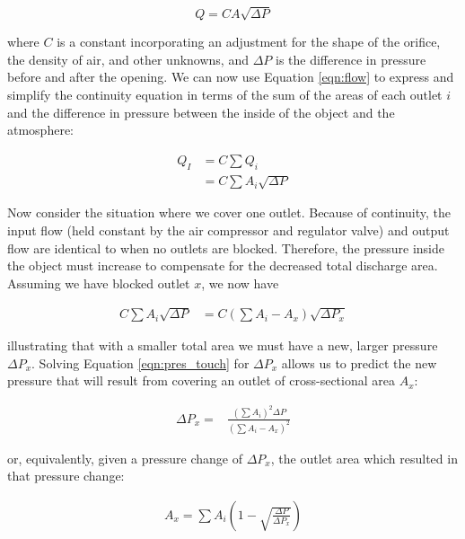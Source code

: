 				\begin{equation}
					Q = CA\sqrt{\Delta P}
					\label{eqn:flow}
				\end{equation}

				where $C$ is a constant incorporating an adjustment for the shape of the
				orifice, the density of air, and other unknowns, and $\Delta P$ is the
				difference in pressure before and after the opening. We can now use
				Equation \ref{eqn:flow} to express and simplify the continuity equation in terms
				of the sum of the areas of each outlet $i$ and the difference in pressure
				between the inside of the object and the atmosphere:

				\begin{align}
					Q_I &= C\sum Q_i \nonumber \\
							&= C\sum A_i \sqrt{\Delta P}
							\label{eqn:flow-per-outlet}
				\end{align}

				Now consider the situation where we cover one outlet. Because of
				continuity, the input flow (held constant by the air compressor and
				regulator valve) and output flow are identical to when no outlets are
				blocked. Therefore, the pressure inside the object must increase to
				compensate for the decreased total discharge area. Assuming we have
				blocked outlet $x$, we now have

				\begin{align}
					C\sum A_i \sqrt{\Delta P} &= C\left( \sum A_i - A_x \right) \sqrt{\Delta P_x}
					\label{eqn:pres_touch}
				\end{align}

				illustrating that with a smaller total area we must have a new, larger
				pressure $\Delta P_x$. Solving Equation \ref{eqn:pres_touch} for $\Delta P_x$
				allows us to predict the new pressure that will result from covering an
				outlet of cross-sectional area $A_x$:

				\begin{align}
					\Delta P_x =& \frac{(\sum A_i)^2 \Delta P}{(\sum A_i - A_x)^2}
					\label{eqn:pressure-from-area}
				\end{align}

				or, equivalently, given a pressure change of $\Delta P_x$, the outlet area
				which resulted in that pressure change:

				\begin{align}
					A_x = \sum A_i \left(1 - \sqrt{\frac{\Delta P}{\Delta P_x}} \right)
					\label{eqn:area-from-pressure}
				\end{align}
				
